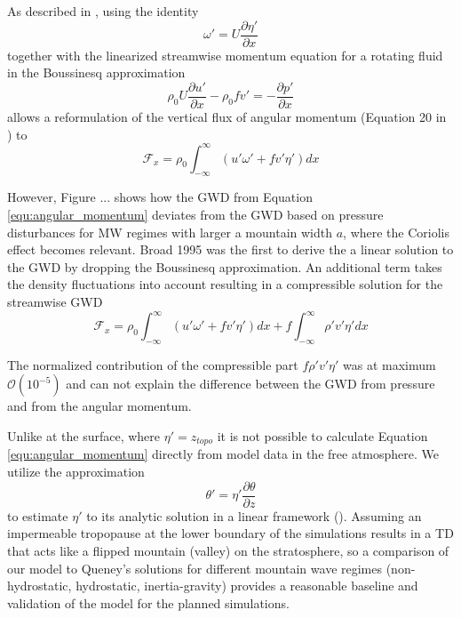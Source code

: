 As described in \textcite{smith_influence_1979}, using the identity
\begin{equation}
    \omega' = U \frac{\partial \eta'}{\partial x}
\end{equation}
together with the linearized streamwise momentum equation for a rotating fluid in the Boussinesq approximation
\begin{equation}
    \rho_0 U \frac{\partial u'}{\partial x} - \rho_0 f v'= -\frac{\partial p'}{\partial x}
\end{equation}
allows a reformulation of the vertical flux of angular momentum (Equation 20 in \textcite[]{bretherton_momentum_1969}) to
\begin{equation}
    \mathcal{F}_x =  \rho_0 \int_{-\infty}^{\infty} (u'\omega' + f v' \eta') dx
    \label{equ:angular_momentum}
\end{equation}

However, Figure ... shows how the GWD from Equation \ref{equ:angular_momentum} deviates from the GWD based on pressure disturbances for MW regimes with larger a mountain width $a$, where the Coriolis effect becomes relevant.
Broad 1995 was the first to derive the a linear solution to the GWD by dropping the Boussinesq approximation. An additional term takes the density fluctuations into account resulting in a compressible solution for the streamwise GWD
\begin{equation}
    \mathcal{F}_x =  \rho_0 \int_{-\infty}^{\infty} (u'\omega' + f v' \eta') dx + f \int_{-\infty}^{\infty} \rho' v' \eta' dx
    \label{equ:angular_momentum_compressible}
\end{equation}

The normalized contribution of the compressible part $f \rho' v' \eta'$ was at maximum $\mathcal{O}(10^{-5})$ and can not explain the difference between the GWD from pressure and from the angular momentum.

Unlike at the surface, where $\eta'=z_{topo}$ it is not possible to calculate Equation \ref{equ:angular_momentum} directly from model data in the free atmosphere. We utilize the approximation
\begin{equation}
    \theta' =  \eta' \frac{\partial \theta}{\partial z}
    \label{equ:thprime}
\end{equation}
to estimate $\eta'$
to its analytic solution in a linear framework (\cite{gill_atmosphere-ocean_1982}). Assuming an impermeable tropopause at the lower boundary of the simulations results in a TD that acts like a flipped mountain (valley) on the stratosphere, so a comparison of our model to Queney's solutions for different mountain wave regimes (non-hydrostatic, hydrostatic, inertia-gravity) provides a reasonable baseline and validation of the model for the planned simulations.

